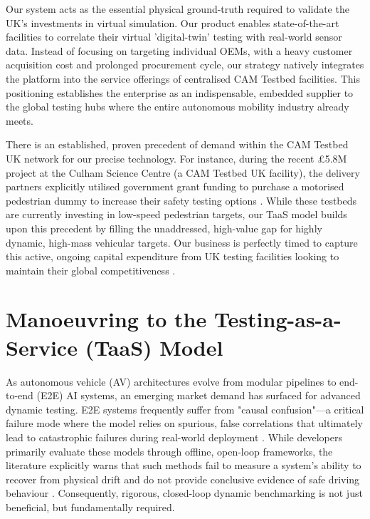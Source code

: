 Our system acts as the essential physical ground-truth required to validate the UK's investments in virtual simulation. Our product enables state-of-the-art facilities to correlate their virtual 'digital-twin' testing with real-world sensor data. Instead of focusing on targeting individual OEMs, with a heavy customer acquisition cost and prolonged procurement cycle, our strategy natively integrates the platform into the service offerings of centralised CAM Testbed facilities. This positioning establishes the enterprise as an indispensable, embedded supplier to the global testing hubs where the entire autonomous mobility industry already meets.

There is an established, proven precedent of demand within the CAM Testbed UK network for our precise technology. For instance, during the recent £5.8M project at the Culham Science Centre (a CAM Testbed UK facility), the delivery partners explicitly utilised government grant funding to purchase a motorised pedestrian dummy to increase their safety testing options \cite[p.~2]{culham_2024}. While these testbeds are currently investing in low-speed pedestrian targets, our TaaS model builds upon this precedent by filling the unaddressed, high-value gap for highly dynamic, high-mass vehicular targets. Our business is perfectly timed to capture this active, ongoing capital expenditure from UK testing facilities looking to maintain their global competitiveness %
.

\section{Manoeuvring to the Testing-as-a-Service (TaaS) Model}

As autonomous vehicle (AV) architectures evolve from modular pipelines to end-to-end (E2E) AI systems, an emerging market demand has surfaced for advanced dynamic testing. E2E systems frequently suffer from "causal confusion"—a critical failure mode where the model relies on spurious, false correlations that ultimately lead to catastrophic failures during real-world deployment \cite[p.~11-2]{chen_2024}. While developers primarily evaluate these models through offline, open-loop frameworks, the literature explicitly warns that such methods fail to measure a system's ability to recover from physical drift and do not provide conclusive evidence of safe driving behaviour \cite[p.~7]{chen_2024}. Consequently, rigorous, closed-loop dynamic benchmarking is not just beneficial, but fundamentally required.

